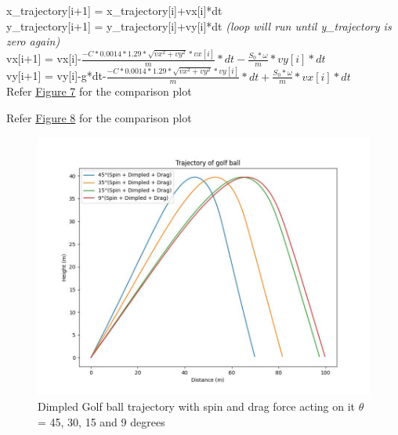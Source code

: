 \documentclass[11pt]{article}
\begin{document}
\begin{raggedright}
\begin{justify}
x\_trajectory[i+1] = x\_trajectory[i]+vx[i]*dt\\
y\_trajectory[i+1] = y\_trajectory[i]+vy[i]*dt \textit{(loop will run until y\_trajectory is zero again)}\\
vx[i+1] = vx[i]-$\frac{-C*0.0014*1.29*\sqrt{vx^2+vy^2}*vx[i]}{m}*dt - \frac{S_0 * \omega}{m}*vy[i]*dt$\\
vy[i+1] = vy[i]-g*dt-$\frac{-C*0.0014*1.29*\sqrt{vx^2+vy^2}*vy[i]}{m}*dt + \frac{S_0 * \omega}{m}*vx[i]*dt$\\

Refer \hyperref[fig:Spin_Dimpled_Fdrag_trajectory]{Figure 7} for the comparison plot

Refer \hyperref[fig:trajectory]{Figure 8} for the comparison plot
\end{justify}
\end{raggedright}
\begin{figure}[b]
    \centering
    \includegraphics[width=\textwidth, height=\textheight, keepaspectratio]{Golf_Trajectory_Spin_Dimpled_drag.jpeg}
    \caption{Dimpled Golf ball trajectory with spin and drag force acting on it $\theta$ = 45, 30, 15 and 9 degrees}
    \label{fig:Spin_Dimpled_Fdrag_trajectory}
\end{figure}
\end{document}
